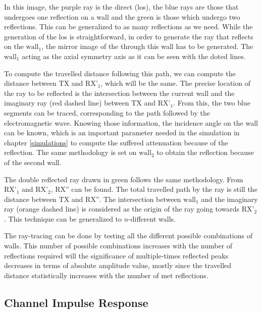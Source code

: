In this image, the purple ray is the direct (\gls{los}), the blue rays are those that undergoes one reflection on a wall and the green is those which undergo two reflections. This can be generalized to as many reflections as we need. While the generation of the \gls{los} is straightforward, in order to generate the ray that reflects on the $\text{wall}_\text{1}$, the mirror image of the  through this wall has to be generated. The $\text{wall}_\text{1}$ acting as the axial symmetry axis as it can be seen with the doted lines.
\vspace{2mm}

To compute the travelled distance following this path, we can compute the distance between $\text{TX}$ and $\text{RX'}_\text{1}$, which will be the same. The precise location of the ray to be reflected is the intersection between the current wall and the imaginary ray (red dashed line) between $\text{TX}$ and $\text{RX'}_\text{1}$. From this, the two blue segments can be traced, corresponding to the path followed by the electromagnetic wave. Knowing those information, the incidence angle on the wall can be known, which is an important parameter needed in the simulation in chapter \ref{simulations} to compute the suffered attenuation because of the reflection. The same methodology is set on $\text{wall}_\text{2}$ to obtain the reflection because of the second wall.
\vspace{2mm}

The double reflected ray drawn in green follows the same methodology. From 
$\text{RX'}_\text{1}$ and $\text{RX'}_\text{2}$, $\text{RX''}$ can be found. The total travelled path by the ray is still the distance between $\text{TX}$ and $\text{RX''}$. The intersection between $\text{wall}_\text{1}$ and the imaginary ray (orange dashed line) is considered as the origin of the ray going towards $\text{RX'}_\text{2}$. This technique can be generalized to $n$-different walls.
\vspace{2mm}

The ray-tracing can be done by testing all the different possible combinations of walls. This number of possible combinations increases with the number of reflections required will the significance of multiple-times reflected peaks decreases in terms of absolute amplitude value, mostly since the travelled distance statistically increases with the number of met reflections.

\subsection{Channel Impulse Response}
\label{mp_cir}

